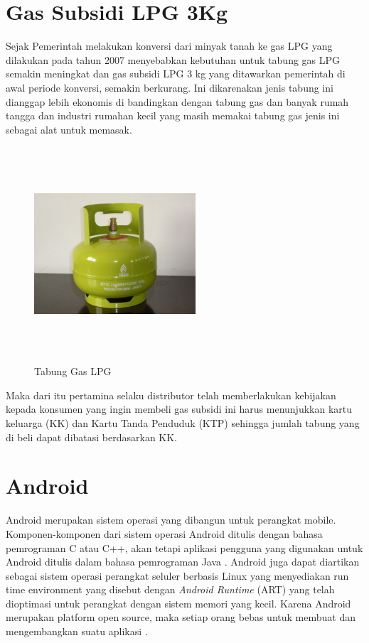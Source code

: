 \section{Gas Subsidi LPG 3Kg}
\par Sejak Pemerintah melakukan konversi dari minyak tanah ke gas LPG yang dilakukan pada tahun 2007 menyebabkan kebutuhan untuk tabung gas LPG semakin meningkat dan gas subsidi LPG 3 kg yang ditawarkan pemerintah di awal periode konversi, semakin berkurang. Ini dikarenakan jenis tabung ini dianggap lebih ekonomis di bandingkan dengan tabung gas dan banyak rumah tangga dan industri rumahan kecil yang masih memakai tabung gas jenis ini sebagai alat untuk memasak.
\begin{figure}[H]
	\centering
	\includegraphics [width = 6cm, height= 8cm]{gambar/tabung-gas}
	\caption{Tabung Gas LPG}
	\label{tabung}
\end{figure}

\par Maka dari itu pertamina selaku distributor telah memberlakukan kebijakan kepada konsumen yang ingin membeli gas subsidi ini harus menunjukkan kartu keluarga (KK) dan Kartu Tanda Penduduk (KTP) sehingga jumlah tabung yang di beli dapat dibatasi berdasarkan KK.

\section{Android}
\par Android merupakan sistem operasi yang dibangun untuk perangkat mobile. Komponen-komponen dari sistem operasi Android ditulis dengan bahasa pemrograman C atau C++, akan tetapi aplikasi pengguna yang digunakan untuk Android ditulis dalam bahasa pemrograman Java \citep{ableson2012android}. Android juga dapat diartikan sebagai sistem operasi perangkat seluler berbasis Linux yang menyediakan run time environment yang disebut dengan \textit{Android Runtime} (ART) yang telah dioptimasi untuk perangkat dengan sistem memori yang kecil. Karena Android merupakan platform open source, maka setiap orang bebas untuk membuat dan mengembangkan suatu aplikasi \citep{supardi2011}.



